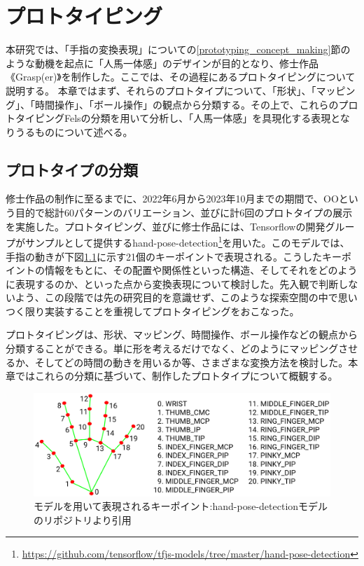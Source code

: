 \chapter{プロトタイピング}
\label{prototyping}
本研究では、「手指の変換表現」についての\ref{prototyping_concept_making}節のような動機を起点に「人馬一体感」のデザインが目的となり、修士作品《Grasp(er)》を制作した。ここでは、その過程にあるプロトタイピングについて説明する。
本章ではまず、それらのプロトタイプについて、「形状」、「マッピング」、「時間操作」、「ボール操作」の観点から分類する。その上で、これらのプロトタイピングFelsの分類を用いて分析し、「人馬一体感」を具現化する表現となりうるものについて述べる。

\section{プロトタイプの分類}
修士作品の制作に至るまでに、2022年6月から2023年10月までの期間で、OOという目的で総計60パターンのバリエーション、並びに計6回のプロトタイプの展示を実施した。プロトタイピング、並びに修士作品には、Tensorflowの開発グループがサンプルとして提供するhand-pose-detection\footnote{\url{https://github.com/tensorflow/tfjs-models/tree/master/hand-pose-detection}}を用いた。このモデルでは、手指の動きが下図\ref{fig:keypoints}に示す21個のキーポイントで表現される。こうしたキーポイントの情報をもとに、その配置や関係性といった構造、そしてそれをどのように表現するのか、といった点から変換表現について検討した。先入観で判断しないよう、この段階では先の研究目的を意識せず、このような探索空間の中で思いつく限り実装することを重視してプロトタイピングをおこなった。

プロトタイピングは、形状、マッピング、時間操作、ボール操作などの観点から分類することができる。単に形を考えるだけでなく、どのようにマッピングさせるか、そしてどの時間の動きを用いるか等、さまざまな変換方法を検討した。本章ではこれらの分類に基づいて、制作したプロトタイプについて概観する。

\begin{figure}[H]
  \centering
  \includegraphics[width=15cm]{img/hand_keypoints.png}
  \caption{モデルを用いて表現されるキーポイント:hand-pose-detectionモデルのリポジトリより引用}
  \label{fig:keypoints}
\end{figure}

